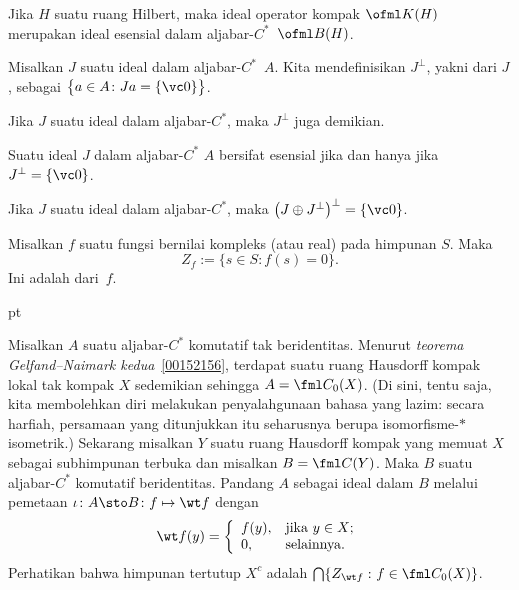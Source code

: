 \begin{exam} Jika $H$ suatu ruang Hilbert, maka ideal operator kompak $\ofml K(H)$
merupakan ideal esensial dalam aljabar-$C^*$~$\ofml B(H)$.
\end{exam}

\begin{defn} Misalkan $J$ suatu ideal dalam aljabar-$C^*$~$A$. Kita mendefinisikan
$J^\perp$, yakni
 dari $J$, sebagai $\bigl\{a \in A\colon Ja = \{\vc 0\}\bigr\}$.
\end{defn}

\begin{prop} Jika $J$ suatu ideal dalam aljabar-$C^*$, maka $J^\perp$ juga demikian.
\end{prop}

\begin{prop}\label{0038465} Suatu ideal $J$ dalam aljabar-$C^*$ $A$ bersifat esensial jika dan hanya
jika $J^\perp = \{\vc 0\}$.
\end{prop}

\begin{prop}\label{0038468} Jika $J$ suatu ideal dalam aljabar-$C^*$, maka $\bigl(J \oplus
J^\perp\bigr)^\perp = \{\vc 0\}$.
\end{prop}

\begin{notn} Misalkan $f$ suatu fungsi bernilai kompleks (atau real) pada himpunan $S$. Maka
  \[ Z_f := \{ s \in S\colon f(s) = 0\}. \]
Ini adalah
 dari~$f$.
\end{notn}

  pt

Misalkan $A$ suatu aljabar-$C^*$ komutatif tak beridentitas. Menurut
\emph{teorema Gelfand--Naimark kedua}~\ref{00152156}, terdapat suatu ruang Hausdorff kompak lokal tak kompak
$X$ sedemikian sehingga $A = \fml C_0(X)$. (Di sini, tentu saja, kita membolehkan
diri melakukan penyalahgunaan bahasa yang lazim: secara harfiah, persamaan yang ditunjukkan itu
seharusnya berupa isomorfisme-$*\,$ isometrik.) Sekarang misalkan $Y$ suatu ruang Hausdorff kompak
yang memuat $X$ sebagai subhimpunan terbuka dan misalkan $B = \fml C(Y)$. Maka $B$ suatu aljabar-$C^*$
komutatif beridentitas. Pandang $A$ sebagai ideal dalam $B$ melalui pemetaan
$\iota\colon A \sto B\colon f \mapsto \wt f$ dengan
  \[ \wt f(y) = \left\{%
                \begin{array}{ll}
                         f(y), & \hbox{jika $y \in X$;} \\
                         0, & \hbox{selainnya.} \\
                \end{array}%
                \right.\]
Perhatikan bahwa himpunan tertutup $X^c$ adalah $\bigcap\{Z_{\wt f}\,\colon f \in \fml C_0(X)\}$.

